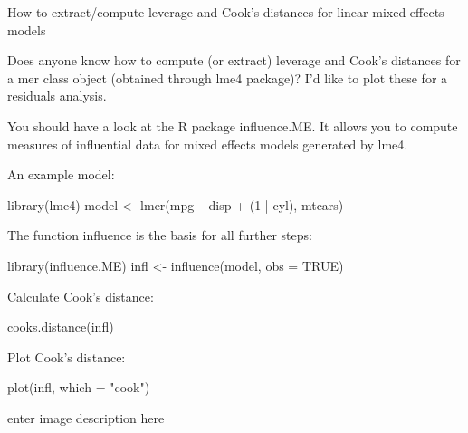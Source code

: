 How to extract/compute leverage and Cook's distances for linear mixed effects models

Does anyone know how to compute (or extract) leverage and Cook's distances for a mer class object (obtained through lme4 package)? I'd like to plot these for a residuals analysis.

You should have a look at the R package influence.ME. It allows you to compute measures of influential data for mixed effects models generated by lme4.

An example model:

library(lme4)
model <- lmer(mpg ~ disp + (1 | cyl), mtcars)

The function influence is the basis for all further steps:

library(influence.ME)
infl <- influence(model, obs = TRUE)

Calculate Cook's distance:

cooks.distance(infl)

Plot Cook's distance:

plot(infl, which = "cook")

enter image description here


